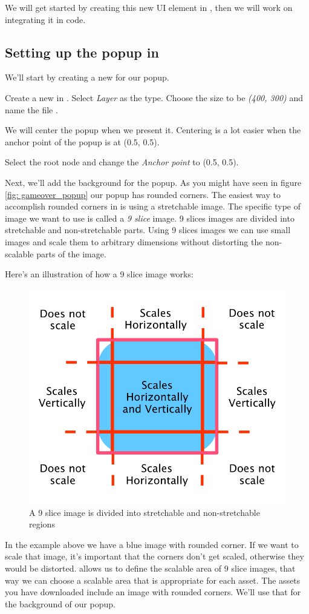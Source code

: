 We will get started by creating this new UI element in \SB{}, then we will work
on integrating it in code.

\subsection{Setting up the popup in \SB{}}
We'll start by creating a new \ccbfile{} for our popup.
\begin{leftbar}
Create a new \ccbfile{} in \SB{}. Select \textit{Layer} as the type. Choose the
size to be \textit{(400, 300)} and name the file .
\end{leftbar}
We will center the popup when we present it. Centering is a lot easier when the
anchor point of the popup is at (0.5, 0.5).
\begin{leftbar}
Select the root node and change the \textit{Anchor point} to (0.5, 0.5).
\end{leftbar} 
Next, we'll add the background for the popup. As you might have seen in figure
\ref{fig: gameover_popup} our popup has rounded corners. The easiest way to
accomplish rounded corners in \cocos{} is using a stretchable image.
 The specific type of image we want to use is called a \textit{9 slice} image. 9
 slices images are divided into stretchable and non-stretchable parts. Using 9 slices images we can
use small images and scale them to arbitrary dimensions without distorting the
non-scalable parts of the image.

Here's an illustration of how a 9 slice image works:
\begin{figure}[H]
    \centering
    \includegraphics[width=0.5\linewidth]{images/Chapter7/9_slice.png}
    \caption{A 9 slice image is divided into stretchable and non-stretchable
    regions}
\end{figure}

In the example above we have a blue image with rounded corner. If we want to
scale that image, it's important that the corners don't get scaled, otherwise
they would be distorted. \SB{} allows us to define the scalable area of 9 slice
images, that way we can choose a scalable area that is appropriate for each
asset. The assets you have downloaded include an image with rounded corners.
We'll use that for the background of our popup.

